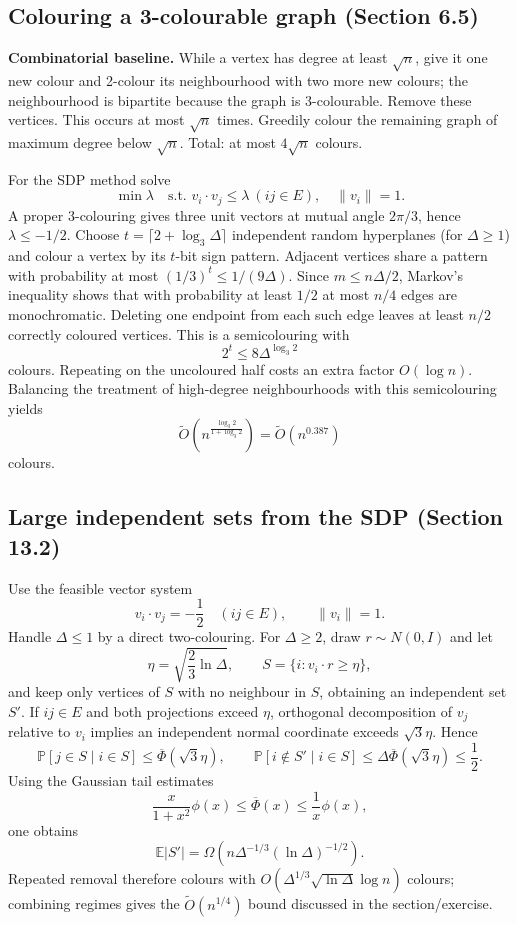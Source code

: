 \documentclass[11pt,a4paper]{article}
\newcommand{\E}{\mathbb E}
\newcommand{\Prb}{\mathbb P}
\newcommand{\1}{\mathbf 1}
\begin{document}
\subsection{Colouring a 3-colourable graph (Section 6.5)}

\textbf{Combinatorial baseline.}  While a vertex has degree at least $\sqrt n$, give
it one new colour and 2-colour its neighbourhood with two more new colours; the
neighbourhood is bipartite because the graph is 3-colourable.  Remove these vertices.
This occurs at most $\sqrt n$ times.  Greedily colour the remaining graph of maximum
degree below $\sqrt n$.  Total: at most $4\sqrt n$ colours.

For the SDP method solve
\[
 \min\lambda\quad\text{s.t. }v_i\cdot v_j\leq\lambda\ (ij\in E),
 \quad \|v_i\|=1.
\]
A proper 3-colouring gives three unit vectors at mutual angle $2\pi/3$, hence
$\lambda\leq-1/2$.  Choose
$t=\lceil2+\log_3\Delta\rceil$ independent random hyperplanes (for $\Delta\geq1$) and colour a vertex by its
$t$-bit sign pattern.  Adjacent vertices share a pattern with probability at most
$(1/3)^t\leq1/(9\Delta)$.  Since $m\leq n\Delta/2$, Markov's inequality shows that
with probability at least $1/2$ at most $n/4$ edges are monochromatic.  Deleting one
endpoint from each such edge leaves at least $n/2$ correctly coloured vertices.
This is a semicolouring with
\[
  2^t\leq8\Delta^{\log_3 2}
\]
colours.  Repeating on the uncoloured half costs an extra factor $O(\log n)$.
Balancing the treatment of high-degree neighbourhoods with this semicolouring yields
\[
  \widetilde O\!\left(n^{\frac{\log_3 2}{1+\log_3 2}}\right)
  =\widetilde O(n^{0.387})
\]
colours.

\subsection{Large independent sets from the SDP (Section 13.2)}

Use the feasible vector system
\[
  v_i\cdot v_j=-\frac12\quad(ij\in E),
  \qquad \|v_i\|=1.
\]
Handle $\Delta\leq1$ by a direct two-colouring. For $\Delta\geq2$, draw $r\sim N(0,I)$ and let
\[
 \eta=\sqrt{\frac23\ln\Delta},\qquad
 S=\{i:v_i\cdot r\geq\eta\},
\]
and keep only vertices of $S$ with no neighbour in $S$, obtaining an independent set
$S'$.  If $ij\in E$ and both projections exceed $\eta$, orthogonal decomposition of
$v_j$ relative to $v_i$ implies an independent normal coordinate exceeds
$\sqrt3\eta$.  Hence
\[
 \Prb[j\in S\mid i\in S]\leq\overline\Phi(\sqrt3\eta),
 \qquad
 \Prb[i\notin S'\mid i\in S]\leq
 \Delta\overline\Phi(\sqrt3\eta)\leq\frac12.
\]
Using the Gaussian tail estimates
\[
 \frac{x}{1+x^2}\phi(x)\leq\overline\Phi(x)
 \leq\frac1x\phi(x),
\]
one obtains
\[
 \E|S'|=\Omega\!\left(n\Delta^{-1/3}(\ln\Delta)^{-1/2}\right).
\]
Repeated removal therefore colours with
$O(\Delta^{1/3}\sqrt{\ln\Delta}\log n)$ colours; combining regimes gives the
$\widetilde O(n^{1/4})$ bound discussed in the section/exercise.
\end{document}
